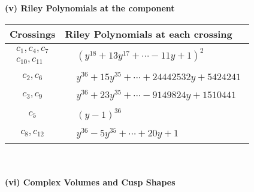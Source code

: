 \documentclass[1p]{elsarticle_modified}
\theoremstyle{definition}
\begin{document}
\newpage\renewcommand{\arraystretch}{1}
\flushleft \textbf{(v) Riley Polynomials at the component}\newline \\
\begin{tabular}{m{50pt}|m{274pt}}
Crossings & \hspace{64pt}Riley Polynomials at each crossing \\
\hline $$\begin{aligned}c_{1},c_{4},c_{7}\\c_{10},c_{11}\end{aligned}$$&$\begin{aligned}
&(y^{18}+13 y^{17}+\cdots-11 y+1)^{2}
\end{aligned}$\\
\hline $$\begin{aligned}c_{2},c_{6}\end{aligned}$$&$\begin{aligned}
&y^{36}+15 y^{35}+\cdots+24442532 y+5424241
\end{aligned}$\\
\hline $$\begin{aligned}c_{3},c_{9}\end{aligned}$$&$\begin{aligned}
&y^{36}+23 y^{35}+\cdots-9149824 y+1510441
\end{aligned}$\\
\hline $$\begin{aligned}c_{5}\end{aligned}$$&$\begin{aligned}
&(y-1)^{36}
\end{aligned}$\\
\hline $$\begin{aligned}c_{8},c_{12}\end{aligned}$$&$\begin{aligned}
&y^{36}-5 y^{35}+\cdots+20 y+1
\end{aligned}$\\
\hline
\end{tabular}\\~\\
\newpage\flushleft \textbf{(vi) Complex Volumes and Cusp Shapes}
\end{document}
